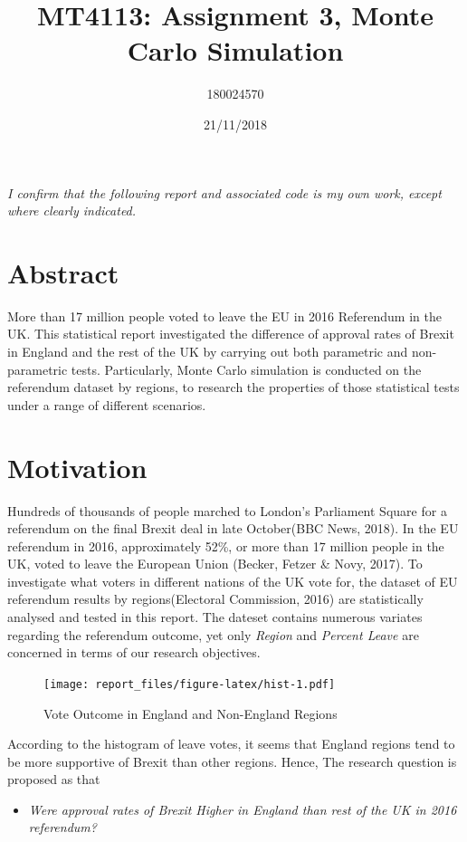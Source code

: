 \documentclass[]{article}
\title{MT4113: Assignment 3, Monte Carlo Simulation}
\author{180024570}
\date{21/11/2018}
\providecommand{\tightlist}{%
  \setlength{\itemsep}{0pt}\setlength{\parskip}{0pt}}
\begin{document}
\maketitle

\emph{I conﬁrm that the following report and associated code is my own
work, except where clearly indicated.}

\hypertarget{abstract}{%
\section{Abstract}\label{abstract}}

More than 17 million people voted to leave the EU in 2016 Referendum in
the UK. This statistical report investigated the difference of approval
rates of Brexit in England and the rest of the UK by carrying out both
parametric and non-parametric tests. Particularly, Monte Carlo
simulation is conducted on the referendum dataset by regions, to
research the properties of those statistical tests under a range of
different scenarios.

\hypertarget{motivation}{%
\section{Motivation}\label{motivation}}

Hundreds of thousands of people marched to London's Parliament Square
for a referendum on the final Brexit deal in late October(BBC News,
2018). In the EU referendum in 2016, approximately 52\%, or more than 17
million people in the UK, voted to leave the European Union (Becker,
Fetzer \& Novy, 2017). To investigate what voters in different nations
of the UK vote for, the dataset of EU referendum results by
regions(Electoral Commission, 2016) are statistically analysed and
tested in this report. The dateset contains numerous variates regarding
the referendum outcome, yet only \emph{Region} and \emph{Percent Leave}
are concerned in terms of our research objectives.

\begin{figure}
\centering
\texttt{[image: report\_files/figure-latex/hist-1.pdf]}
\caption{Vote Outcome in England and Non-England Regions}
\end{figure}

According to the histogram of leave votes, it seems that England regions
tend to be more supportive of Brexit than other regions. Hence, The
research question is proposed as that

\begin{itemize}
\tightlist
\item
  \emph{Were approval rates of Brexit Higher in England than rest of the
  UK in 2016 referendum?}
\end{itemize}
\end{document}
